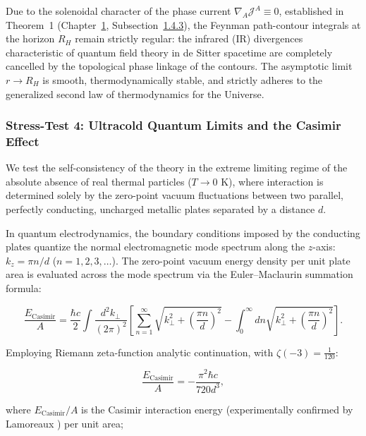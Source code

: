 Due to the solenoidal character of the phase current $\nabla_A \mathcal{J}^A \equiv 0$, established in Theorem~1 (Chapter~\hyperref[sec:rozdil1]{1}, Subsection~\hyperref[sec:1.4.3]{1.4.3}), the Feynman path-contour integrals at the horizon $R_H$ remain strictly regular: the infrared (IR) divergences characteristic of quantum field theory in de Sitter spacetime are completely cancelled by the topological phase linkage of the contours. The asymptotic limit $r \to R_H$ is smooth, thermodynamically stable, and strictly adheres to the generalized second law of thermodynamics for the Universe.

\subsubsection{Stress-Test 4: Ultracold Quantum Limits and the Casimir Effect}\label{sec:5.4.4}

We test the self-consistency of the theory in the extreme limiting regime of the absolute absence of real thermal particles ($T \to 0\text{ K}$), where interaction is determined solely by the zero-point vacuum fluctuations between two parallel, perfectly conducting, uncharged metallic plates separated by a distance $d$.

In quantum electrodynamics, the boundary conditions imposed by the conducting plates quantize the normal electromagnetic mode spectrum along the $z$-axis: $k_z = \pi n / d$ ($n = 1, 2, 3, \dots$). The zero-point vacuum energy density per unit plate area is evaluated across the mode spectrum via the Euler--Maclaurin summation formula:

\begin{equation}\label{eq:5.67}\tag{5.67}
\frac{E_{\text{Casimir}}}{A} = \frac{\hbar c}{2} \int \frac{d^2 k_\perp}{(2\pi)^2} \left[ \sum_{n=1}^\infty \sqrt{k_\perp^2 + \left(\frac{\pi n}{d}\right)^2} - \int_0^\infty dn \sqrt{k_\perp^2 + \left(\frac{\pi n}{d}\right)^2} \right].
\end{equation}

Employing Riemann zeta-function analytic continuation, with $\zeta(-3) = \frac{1}{120}$:

\begin{equation}\label{eq:5.68}\tag{5.68}
\frac{E_{\text{Casimir}}}{A} = - \frac{\pi^2 \hbar c}{720 d^3},
\end{equation}

where $E_{\text{Casimir}} / A$ is the Casimir interaction energy \cite{ref45} (experimentally confirmed by Lamoreaux \cite{ref46}) per unit area;  

